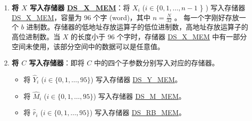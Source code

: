 \documentclass[main\_\_CN.tex]{subfiles}
\begin{document}
\begin{enumerate}
    \item {\bfseries 将 \begin{math}X\end{math} 写入存储器 \hyperref[DSXMEM]{DS\_X\_MEM}}：将 \begin{math}X_{i}\end{math}
        (\begin{math}i \in \{ 0, 1, \dots, n-1 \end{math} \} )
        写入存储器 \hyperref[DSXMEM]{DS\_X\_MEM}，容量为 96 个字 (word)，其中 \begin{math} n = \frac{N}{32} \end{math} 。
        每一个字刚好存放一个 \begin{math}b\end{math} 进制数。存储器的低地址存放运算子的低位进制数，高地址存放运算子的高位进制数。当 \begin{math}X\end{math} 的长度小于 96 个字时，存储器 \hyperref[DSXMEM]{DS\_X\_MEM} 中有一部分空间未使用，该部分空间中的数据可以是任意值。
        
    \item {\bfseries 将 \begin{math}C\end{math} 写入存储器}：即将 \begin{math}C\end{math} 中的四个子参数分别写入对应的存储器。
    \begin{itemize}
        
        \item 将 \begin{math}\widehat{Y}_{i}\end{math}
        (\begin{math}i \in \{ 0, 1, \dots, 95 \} \end{math})
        写入存储器 \hyperref[DSYMEM]{DS\_Y\_MEM}。
        
        \item 将 \begin{math}\widehat{M}_{i}\end{math}
        (\begin{math}i \in \{ 0, 1, \dots, 95 \} \end{math})
        写入存储器 \hyperref[DSMMEM]{DS\_M\_MEM}。
        
        \item 将 \begin{math}\widehat{\overline{r}}_{i}\end{math}
        (\begin{math}i \in \{ 0, 1, \dots, 95 \} \end{math})
        写入存储器 \hyperref[DSRBMEM]{DS\_RB\_MEM}。
        

\end{itemize}
\end{enumerate}
\end{document}

